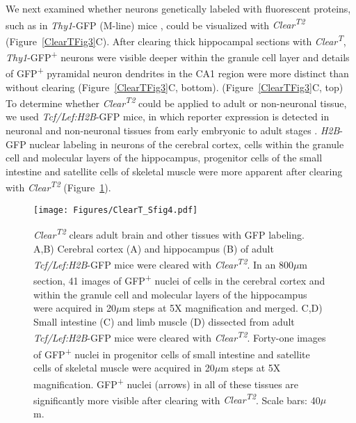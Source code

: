 We next examined whether neurons genetically labeled with fluorescent proteins, such as in \emph{Thy1}-GFP (M-line) mice \cite{feng2000imaging}, could be visualized with \emph{Clear\textsuperscript{T2}} (Figure~\ref{ClearTFig3}C).
After clearing thick hippocampal sections with \emph{Clear\textsuperscript{T}}, \emph{Thy1}-GFP\textsuperscript{+} neurons were visible deeper within the granule cell layer and details of GFP\textsuperscript{+} pyramidal neuron dendrites in the CA1 region were more distinct than without clearing (Figure~\ref{ClearTFig3}C, bottom). (Figure~\ref{ClearTFig3}C, top)
To determine whether \emph{Clear\textsuperscript{T2}} could be applied to adult or non-neuronal tissue, we used \emph{Tcf/Lef:H2B}-GFP mice, in which reporter expression is detected in neuronal and non-neuronal tissues from early embryonic to adult stages \cite{ferrer2010sensitive}.
\emph{H2B}-GFP nuclear labeling in neurons of the cerebral cortex, cells within the granule cell and molecular layers of the hippocampus, progenitor cells of the small intestine and satellite cells of skeletal muscle were more apparent after clearing with \emph{Clear\textsuperscript{T2}} (Figure~\ref{ClearTSfig4}).
\begin{figure}[hbtp]
    \begin{center}
        \texttt{[image: Figures/ClearT\_Sfig4.pdf]}
        \caption[\emph{Clear\textsuperscript{T2}} clears adult brain and other tissues with GFP labeling.]
        {\emph{Clear\textsuperscript{T2}} clears adult brain and other tissues with GFP labeling.
        A,B) Cerebral cortex (A) and hippocampus (B) of adult \emph{Tcf/Lef:H2B}-GFP mice were cleared with \emph{Clear\textsuperscript{T2}}.
        In an 800$\mu$m section, 41 images of GFP\textsuperscript{+} nuclei of cells in the cerebral cortex and within the granule cell and molecular layers of the hippocampus were acquired in 20$\mu$m steps at 5X magnification and merged.
        C,D) Small intestine (C) and limb muscle (D) dissected from adult \emph{Tcf/Lef:H2B}-GFP mice were cleared with \emph{Clear\textsuperscript{T2}}.
        Forty-one images of GFP\textsuperscript{+} nuclei in progenitor cells of small intestine and satellite cells of skeletal muscle were acquired in 20$\mu$m steps at 5X magnification.
        GFP\textsuperscript{+} nuclei (arrows) in all of these tissues are significantly more visible after clearing with \emph{Clear\textsuperscript{T2}}.
        Scale bars: 40$\mu$m.
        }
        \label{ClearTSfig4}
    \end{center}
\end{figure}

